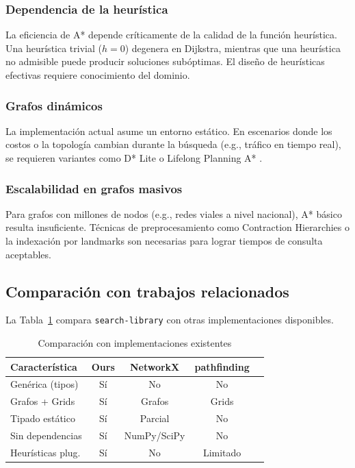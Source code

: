 \subsubsection{Dependencia de la heurística}

La eficiencia de A* depende críticamente de la calidad de la función heurística. Una heurística trivial ($h = 0$) degenera en Dijkstra, mientras que una heurística no admisible puede producir soluciones subóptimas. El diseño de heurísticas efectivas requiere conocimiento del dominio.

\subsubsection{Grafos dinámicos}

La implementación actual asume un entorno estático. En escenarios donde los costos o la topología cambian durante la búsqueda (e.g., tráfico en tiempo real), se requieren variantes como D* Lite \cite{koenig2002d} o Lifelong Planning A* \cite{koenig2004lifelong}.

\subsubsection{Escalabilidad en grafos masivos}

Para grafos con millones de nodos (e.g., redes viales a nivel nacional), A* básico resulta insuficiente. Técnicas de preprocesamiento como Contraction Hierarchies \cite{geisberger2008contraction} o la indexación por landmarks son necesarias para lograr tiempos de consulta aceptables.

\subsection{Comparación con trabajos relacionados}

La Tabla~\ref{tab:related} compara \texttt{search-library} con otras implementaciones disponibles.

\begin{table}[H]
\centering
\caption{Comparación con implementaciones existentes}
\label{tab:related}
\renewcommand{\arraystretch}{1.2}
\begin{tabular}{@{}lcccc@{}}
\toprule
\textbf{Característica} & \textbf{Ours} & \textbf{NetworkX} & \textbf{pathfinding} \\
\midrule
Genérica (tipos) & Sí & No & No \\
Grafos + Grids & Sí & Grafos & Grids \\
Tipado estático & Sí & Parcial & No \\
Sin dependencias & Sí & NumPy/SciPy & No \\
Heurísticas plug. & Sí & No & Limitado \\
\bottomrule
\end{tabular}
\end{table}
